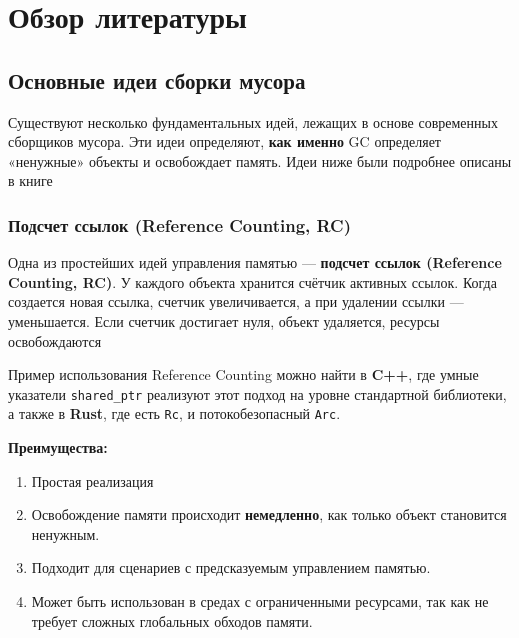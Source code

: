 \section{Обзор литературы}

\subsection{Основные идеи сборки мусора}

Существуют несколько фундаментальных идей, лежащих в основе современных сборщиков мусора. Эти идеи определяют, \textbf{как именно} GC определяет «ненужные» объекты и освобождает память. Идеи ниже были подробнее описаны в книге~\cite{gc-handbook}

\subsubsection{Подсчет ссылок (Reference Counting, RC)}

Одна из простейших идей управления памятью — \textbf{подсчет ссылок (Reference Co\-unting, RC)}. У каждого объекта хранится счётчик активных ссылок. Когда создается новая ссылка, счетчик увеличивается, а при удалении ссылки — уменьшается. Если счетчик достигает нуля, объект удаляется, ресурсы освобождаются

Пример использования Reference Counting можно найти в \textbf{C++}, где умные указатели \texttt{shared\_ptr} реализуют этот подход на уровне стандартной библиотеки, а также в \textbf{Rust}, где есть \texttt{Rc}, и потокобезопасный \texttt{Arc}.

\textbf{Преимущества:}
\begin{enumerate}[label=\arabic*.]
    \item Простая реализация
    \item Освобождение памяти происходит \textbf{немедленно}, как только объект становится ненужным.
    \item Подходит для сценариев с предсказуемым управлением памятью.
    \item Может быть использован в средах с ограниченными ресурсами, так как не требует сложных глобальных обходов памяти.
\end{enumerate}

